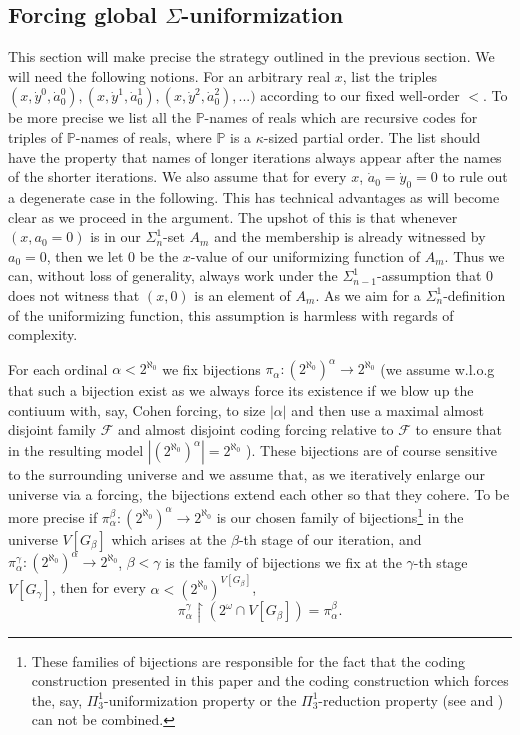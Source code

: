 \documentclass[a4paper,11pt]{article}
\newcommand{\forceP}{\mathbb{P}}
\begin{document}
\subsection{Forcing global $\Sigma$-uniformization}
This section will make precise the strategy outlined in the previous section.
We will need the following notions. For an arbitrary real $x$, list the triples
$(x,\dot{y}^0,\dot{a}_0^0), (x,\dot{y}^1,\dot{a}_0^1), (x,\dot{y}^2,\dot{a}_0^2),...)$ according to our fixed well-order $<$. To be more precise we list all the $\forceP$-names of reals which are recursive codes for triples of $\forceP$-names of reals, where $\forceP$ is a $\kappa$-sized
partial order. The list should have the property that names of longer iterations always appear after the names of the shorter iterations. We also assume that for every $x$, $\dot{a}_0=\dot{y}_0=0$ to rule out a degenerate case in the following. This has technical advantages as will become clear as we proceed in the argument. The upshot of this is that whenever $(x,a_0=0)$ is in our $\Sigma^1_{n}$-set $A_m$ and the membership is already witnessed by $a_0=0$, then we let $0$ be the $x$-value of our uniformizing function of $A_m$.
Thus we can, without loss of generality, always work under the $\Sigma^1_{n-1}$-assumption that $0$ does not witness that $(x,0)$ is an element of $A_m$. As we aim for a $\Sigma^1_n$-definition of the uniformizing function, this assumption is harmless with regards of complexity.


For each ordinal $\alpha< 2^{\aleph_0}$ we fix
bijections $\pi_{\alpha}: (2^{\aleph_0})^{\alpha} \rightarrow 2^{\aleph_0}$ (we assume w.l.o.g that such a bijection exist as we always force its existence if we blow up the contiuum with, say, Cohen forcing, to size $|\alpha|$ and then use a maximal almost disjoint family $\mathcal{F}$ and almost disjoint coding forcing relative to $\mathcal{F}$ to ensure that in the resulting model $|(2^{\aleph_0})^{\alpha}| = 2^{\aleph_0}$ ). These bijections are of course sensitive to the surrounding universe and we assume that, as we iteratively enlarge our universe via a forcing, the bijections extend each other so that they cohere. To be more precise if $\pi_{\alpha}^{\beta}: (2^{\aleph_0})^{\alpha} \rightarrow 2^{\aleph_0}$ is our chosen family of bijections\footnote{These families of bijections are responsible for the fact that the coding construction presented in this paper and the coding construction which forces the, say, $\Pi^1_3$-uniformization property or the $\Pi^1_3$-reduction property (see \cite{Ho4} and \cite{Ho2}) can not be combined. } in the universe $V[G_{\beta}]$ which arises at the $\beta$-th stage of our iteration,  and $\pi_{\alpha}^{\gamma}: (2^{\aleph_0})^{\alpha} \rightarrow 2^{\aleph_0}$, $\beta< \gamma$ is the  family of bijections we fix at the $\gamma$-th stage $V[G_{\gamma}]$, then for every $\alpha< (2^{\aleph_0})^{V[G_{\beta}]}$,  \[\pi^{\gamma}_{\alpha} \upharpoonright (2^{\omega} \cap V[G_{\beta}] ) = \pi^{\beta}_{\alpha} .\]
\end{document}
